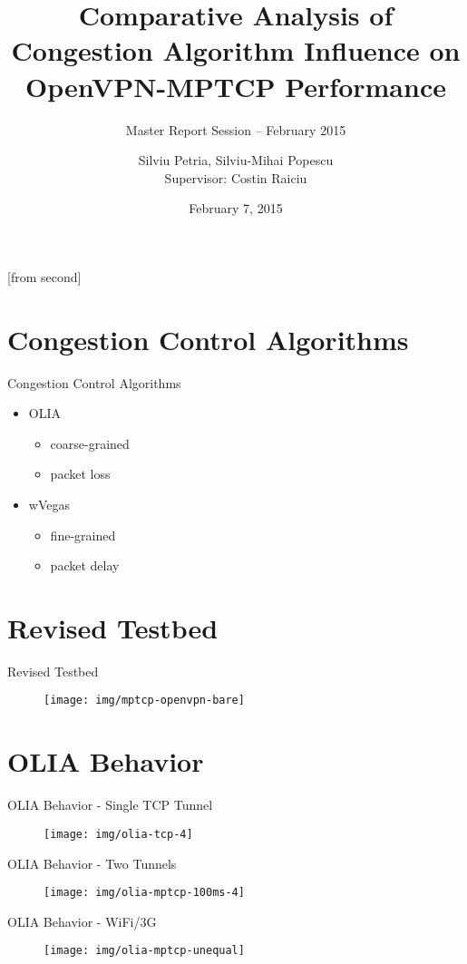 \documentclass{beamer}
\title[Comparative Analysis of Congestion Algorithm
Influence on OpenVPN-MPTCP Performance]{Comparative Analysis of Congestion
Algorithm Influence on OpenVPN-MPTCP Performance}
\subtitle{Master Report Session -- February 2015}
\institute{Faculty of Automatic Control and Computers,\\
	University POLITEHNICA of Bucharest}
\author[Silviu Petria, Silviu-Mihai Popescu]{Silviu Petria, Silviu-Mihai
Popescu\\
	Supervisor: Costin Raiciu}
\date{February 7, 2015}
\begin{document}
[from second]

\frame{\titlepage}

\section{Congestion Control Algorithms}
\begin{frame}{Congestion Control Algorithms}
  \begin{itemize}
    \item OLIA
    \begin{itemize}
      \item coarse-grained
      \item packet loss
    \end{itemize}
    \item wVegas
    \begin{itemize}
      \item fine-grained
      \item packet delay
    \end{itemize}
  \end{itemize}
\end{frame}

\section{Revised Testbed}
\begin{frame}{Revised Testbed}
  \begin{figure}
    \texttt{[image: img/mptcp-openvpn-bare]}
  \end{figure}
\end{frame}

\section{OLIA Behavior}
\begin{frame}{OLIA Behavior - Single TCP Tunnel}
  \begin{figure}
    \texttt{[image: img/olia-tcp-4]}
  \end{figure}
\end{frame}
\begin{frame}{OLIA Behavior - Two Tunnels}
  \begin{figure}
    \texttt{[image: img/olia-mptcp-100ms-4]}
  \end{figure}
\end{frame}
\begin{frame}{OLIA Behavior - WiFi/3G}
  \begin{figure}
    \texttt{[image: img/olia-mptcp-unequal]}
  \end{figure}
\end{frame}
\end{document}
